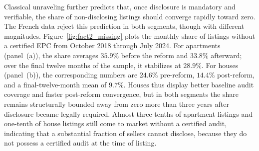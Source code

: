 Classical unraveling further predicts that, once disclosure is mandatory and verifiable, the share of non-disclosing listings should converge rapidly toward zero. The French data reject this prediction in both segments, though with different magnitudes. Figure~\ref{fig:fact2_missing} plots the monthly share of listings without a certified EPC from October 2018 through July 2024. For apartments (panel~(a)), the share averages $35.9\%$ before the reform and $33.8\%$ afterward; over the final twelve months of the sample, it stabilizes at $28.9\%$. For houses (panel~(b)), the corresponding numbers are $24.6\%$ pre-reform, $14.4\%$ post-reform, and a final-twelve-month mean of $9.7\%$. Houses thus display better baseline audit coverage and faster post-reform convergence, but in both segments the share remains structurally bounded away from zero more than three years after disclosure became legally required. Almost three-tenths of apartment listings and one-tenth of house listings still come to market without a certified audit, indicating that a substantial fraction of sellers cannot disclose, because they do not possess a certified audit at the time of listing.
